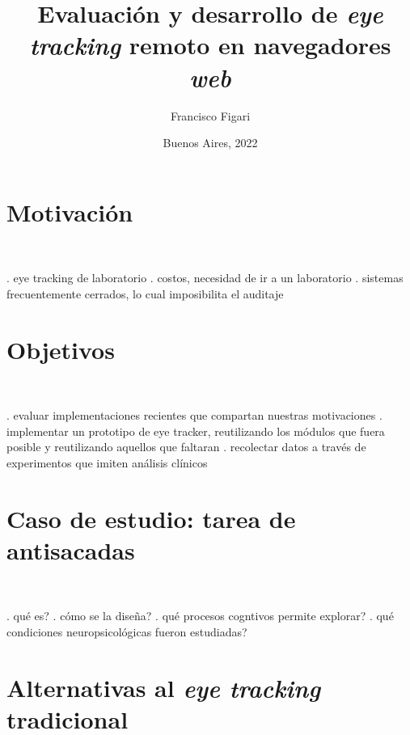 \documentclass{beamer}
\title{Evaluación y desarrollo de \textit{eye tracking} remoto en navegadores
\textit{web}}
\author{Francisco Figari}
\date{Buenos Aires, 2022}
\begin{document}

\frame{\titlepage}

\section{Motivación}

\begin{frame}{~}

. eye tracking de laboratorio
. costos, necesidad de ir a un laboratorio
. sistemas frecuentemente cerrados, lo cual imposibilita el auditaje

\end{frame}

\section{Objetivos}

\begin{frame}{~}

. evaluar implementaciones recientes que compartan nuestras motivaciones 
. implementar un prototipo de eye tracker, reutilizando los módulos que fuera
  posible y reutilizando aquellos que faltaran
. recolectar datos a través de experimentos que imiten análisis clínicos

\end{frame}

\section{Caso de estudio: tarea de antisacadas}

\begin{frame}{~}

. qué es?
. cómo se la diseña?
. qué procesos cogntivos permite explorar?
. qué condiciones neuropsicológicas fueron estudiadas?

\end{frame}

\section{Alternativas al \textit{eye tracking} tradicional}
\end{document}
